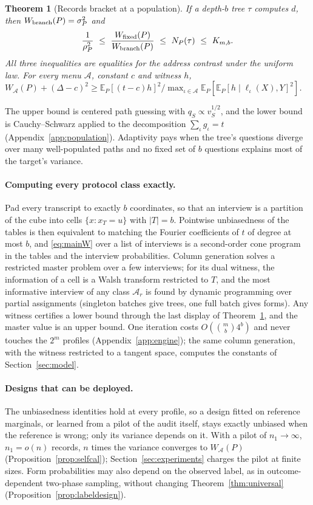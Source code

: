 \documentclass{article}
\newtheorem{theorem}{Theorem}
\newcommand{\E}{\mathbb{E}}
\newcommand{\A}{\mathcal A}
\begin{document}
\begin{theorem}[Records bracket at a population]\label{thm:bracket}
If a depth-$b$ tree $\tau$ computes $d$, then $W_{\rm branch}(P)=\sigma_P^2$ and
\[
 \frac1{\rho_P^2}\ \le\ \frac{W_{\rm fixed}(P)}{W_{\rm branch}(P)}\ \le\ N_P(\tau)\ \le\ K_{m,b}.
\]
All three inequalities are equalities for the address contrast under the uniform law. For every menu $\A$, constant $c$ and witness $h$, $W_\A(P)+(\Delta-c)^2\ge\E_P[(t-c)h]^2/\max_{\iota\in\A}\E_P[\E_P[h\mid\ell_\iota(X),Y]^2]$.
\end{theorem}
The upper bound is centered path guessing with $q_S\propto v_S^{1/2}$, and the lower bound is Cauchy--Schwarz applied to the decomposition $\sum_\iota g_\iota=t$ (Appendix~\ref{app:population}). Adaptivity pays when the tree's questions diverge over many well-populated paths and no fixed set of $b$ questions explains most of the target's variance.

\paragraph{Computing every protocol class exactly.}
Pad every transcript to exactly $b$ coordinates, so that an interview is a partition of the cube into cells $\{x:x_T=u\}$ with $|T|=b$. Pointwise unbiasedness of the tables is then equivalent to matching the Fourier coefficients of $t$ of degree at most $b$, and \eqref{eq:mainW} over a list of interviews is a second-order cone program in the tables and the interview probabilities. Column generation solves a restricted master problem over a few interviews; for its dual witness, the information of a cell is a Walsh transform restricted to $T$, and the most informative interview of any class $\A_r$ is found by dynamic programming over partial assignments (singleton batches give trees, one full batch gives forms). Any witness certifies a lower bound through the last display of Theorem~\ref{thm:bracket}, and the master value is an upper bound. One iteration costs $O(\binom mb4^b)$ and never touches the $2^m$ profiles (Appendix~\ref{app:engine}); the same column generation, with the witness restricted to a tangent space, computes the constants of Section~\ref{sec:model}.

\paragraph{Designs that can be deployed.}
The unbiasedness identities hold at every profile, so a design fitted on reference marginals, or learned from a pilot of the audit itself, stays exactly unbiased when the reference is wrong; only its variance depends on it. With a pilot of $n_1\to\infty$, $n_1=o(n)$ records, $n$ times the variance converges to $W_\A(P)$ (Proposition~\ref{prop:selfcal}); Section~\ref{sec:experiments} charges the pilot at finite sizes. Form probabilities may also depend on the observed label, as in outcome-dependent two-phase sampling, without changing Theorem~\ref{thm:universal} (Proposition~\ref{prop:labeldesign}).
\end{document}
